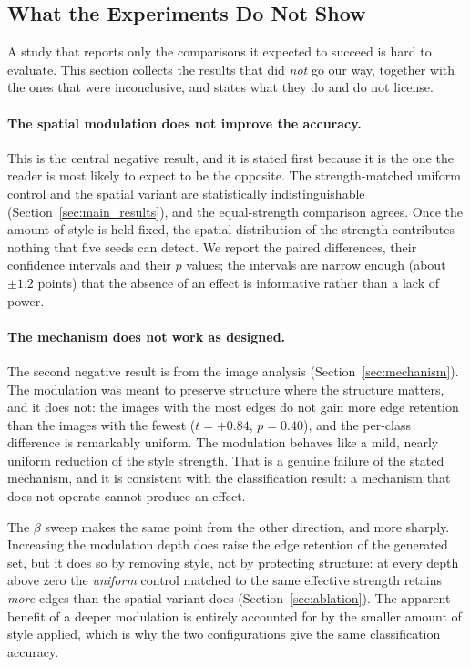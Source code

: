 \subsection{What the Experiments Do Not Show}
\label{sec:negative_results}

A study that reports only the comparisons it expected to succeed is hard
to evaluate. This section collects the results that did \emph{not} go our
way, together with the ones that were inconclusive, and states what they
do and do not license.

\paragraph{The spatial modulation does not improve the accuracy.}
This is the central negative result, and it is stated first because it is
the one the reader is most likely to expect to be the opposite. The
strength-matched uniform control and the spatial variant are statistically
indistinguishable (Section~\ref{sec:main_results}), and the equal-strength
comparison agrees. Once the amount of style is held fixed, the spatial
distribution of the strength contributes nothing that five seeds can
detect. We report the paired differences, their confidence intervals and
their $p$ values; the intervals are narrow enough (about $\pm1.2$ points)
that the absence of an effect is informative rather than a lack of power.

\paragraph{The mechanism does not work as designed.}
The second negative result is from the image analysis
(Section~\ref{sec:mechanism}). The modulation was meant to preserve
structure where the structure matters, and it does not: the images with
the most edges do not gain more edge retention than the images with the
fewest ($t = +0.84$, $p = 0.40$), and the per-class difference is
remarkably uniform. The modulation behaves like a mild, nearly uniform
reduction of the style strength. That is a genuine failure of the stated
mechanism, and it is consistent with the classification result: a
mechanism that does not operate cannot produce an effect.

The $\beta$ sweep makes the same point from the other direction, and more
sharply. Increasing the modulation depth does raise the edge retention of
the generated set, but it does so by removing style, not by protecting
structure: at every depth above zero the \emph{uniform} control matched to
the same effective strength retains \emph{more} edges than the spatial
variant does (Section~\ref{sec:ablation}). The apparent benefit of a
deeper modulation is entirely accounted for by the smaller amount of
style applied, which is why the two configurations give the same
classification accuracy.


